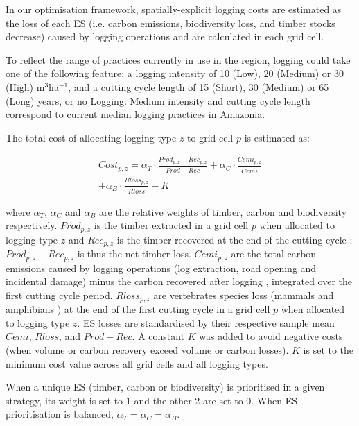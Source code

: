\documentclass{article}
\begin{document}
In our optimisation framework, spatially-explicit logging costs are estimated as the loss of each ES (i.e. carbon emissions, biodiversity loss, and timber stocks decrease) caused by logging operations and are calculated in each grid cell.

To reflect the range of practices currently in use in the region, logging could take one of the following feature: a logging intensity of 10 (Low), 20 (Medium) or 30 (High) m$^3$ha$^{−1}$, and a cutting cycle length of 15 (Short), 30 (Medium) or 65 (Long) years, or no Logging. Medium intensity and cutting cycle length correspond to current median logging practices in Amazonia. 

The total cost of allocating logging type $z$ to grid cell $p$ is estimated as: 

\begin{equation}
\begin{split}
    Cost_{p,z} = \alpha _T \cdot \frac{Prod_{p,z} - Rec_{p,z}}{\overline{Prod - Rec}} + \alpha _C \cdot \frac{Cemi_{p,z}}{\overline{Cemi} } \\ + \alpha _B \cdot \frac{Rloss_{p,z}}{\overline{Rloss}} - K
\end{split}
\end{equation}

where $\alpha_T$, $\alpha_C$ and $\alpha_B$ are the relative weights of timber, carbon and biodiversity respectively. 
$Prod_{p,z}$ is the timber extracted in a grid cell $p$ when allocated to logging type $z$ and $Rec_{p,z}$ is the timber recovered at the end of the cutting cycle \cite{Piponiotc}: $Prod_{p,z} - Rec_{p,z}$ is thus the net timber loss.
$Cemi_{p,z}$ are the total carbon emissions caused by logging operations (log extraction, road opening and incidental damage) minus the carbon recovered after logging \cite{Piponiot2016a}, integrated over the first cutting cycle period.
$Rloss_{p,z}$ are vertebrates species loss (mammals and amphibians \cite{Jenkins2013}) at the end of the first cutting cycle in a grid cell $p$ when allocated to logging type $z$. 
ES losses are standardised by their respective sample mean $\overline{Cemi}$, $\overline{Rloss}$, and $\overline{Prod-Rec}$. 
A constant $K$ was added to avoid negative costs (when volume or carbon recovery exceed volume or carbon losses). $K$ is set to the minimum cost value across all grid cells and all logging types. 

When a unique ES (timber, carbon or biodiversity) is prioritised in a given strategy, its weight is set to 1 and the other 2 are set to 0. When ES prioritisation is balanced, $\alpha_T = \alpha_C = \alpha_B$.
\end{document}
